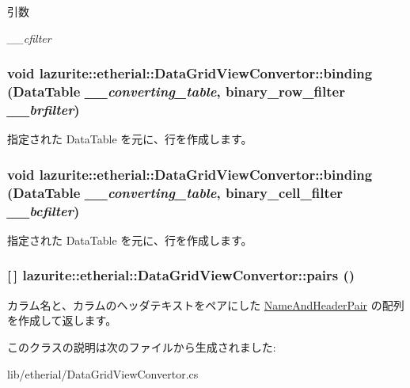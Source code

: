 \begin{DoxyParams}{引数}
\item[{\em \_\-\_\-cfilter}]\end{DoxyParams}
\hypertarget{classlazurite_1_1etherial_1_1_data_grid_view_convertor_a158ef6d9f8296448e225e73198431050}{
\subsubsection[{binding}]{\setlength{\rightskip}{0pt plus 5cm}void lazurite::etherial::DataGridViewConvertor::binding (DataTable {\em \_\-\_\-converting\_\-table}, \/  binary\_\-row\_\-filter {\em \_\-\_\-brfilter})}}
\label{classlazurite_1_1etherial_1_1_data_grid_view_convertor_a158ef6d9f8296448e225e73198431050}
指定された DataTable を元に、行を作成します。 \hypertarget{classlazurite_1_1etherial_1_1_data_grid_view_convertor_a352bd8d95aa50eadf6f3a54c9fe8115c}{
\subsubsection[{binding}]{\setlength{\rightskip}{0pt plus 5cm}void lazurite::etherial::DataGridViewConvertor::binding (DataTable {\em \_\-\_\-converting\_\-table}, \/  binary\_\-cell\_\-filter {\em \_\-\_\-bcfilter})}}
\label{classlazurite_1_1etherial_1_1_data_grid_view_convertor_a352bd8d95aa50eadf6f3a54c9fe8115c}
指定された DataTable を元に、行を作成します。 \hypertarget{classlazurite_1_1etherial_1_1_data_grid_view_convertor_ac7d685e90bd9935c1abf22bffe101c9a}{
\subsubsection[{pairs}]{ \mbox{[}$\,$\mbox{]} lazurite::etherial::DataGridViewConvertor::pairs ()}}
\label{classlazurite_1_1etherial_1_1_data_grid_view_convertor_ac7d685e90bd9935c1abf22bffe101c9a}
カラム名と、カラムのヘッダテキストをペアにした \hyperlink{classlazurite_1_1etherial_1_1_data_grid_view_convertor_1_1_name_and_header_pair}{NameAndHeaderPair} の配列を作成して返します。 

このクラスの説明は次のファイルから生成されました:\begin{DoxyCompactItemize}
\item 
lib/etherial/DataGridViewConvertor.cs\end{DoxyCompactItemize}
